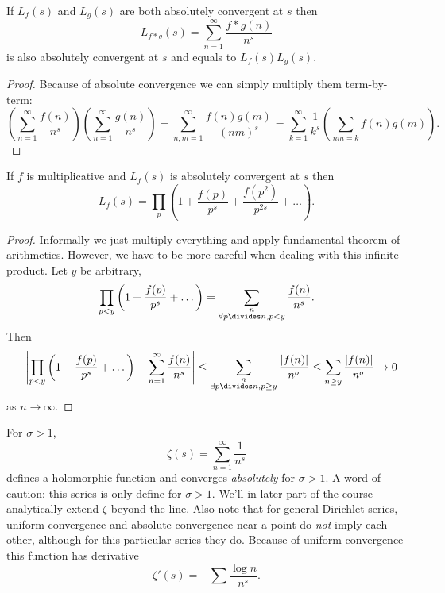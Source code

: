 \documentclass[a4paper]{article}
\theoremstyle{definition}
\begin{document}
\begin{lemma}
  If \(L_f(s)\) and \(L_g(s)\) are both absolutely convergent at \(s\) then
  \[
    L_{f * g} (s) = \sum_{n = 1}^\infty \frac{f * g (n)}{n^s}
    \]
    is also absolutely convergent at \(s\) and equals to \(L_f(s) L_g(s)\).
\end{lemma}

\begin{proof}
  Because of absolute convergence we can simply multiply them term-by-term:
  \[
    \left( \sum_{n = 1}^\infty \frac{f(n)}{n^s} \right) \left( \sum_{n = 1}^\infty \frac{g(n)}{n^s} \right)
    = \sum_{n, m = 1}^\infty \frac{f(n) g(m)}{(nm)^s} = \sum_{k = 1}^\infty \frac{1}{k^s} \left( \sum_{nm = k} f(n) g(m) \right).
  \]
\end{proof}

\begin{lemma}
  If \(f\) is multiplicative and \(L_f(s)\) is absolutely convergent at \(s\) then
  \[
    L_f(s) = \prod_p \left( 1 + \frac{f(p)}{p^s} + \frac{f(p^2)}{p^{2s}} + \dots \right).
  \]
\end{lemma}

\begin{proof}
  Informally we just multiply everything and apply fundamental theorem of arithmetics. However, we have to be more careful when dealing with this infinite product. Let \(y\) be arbitrary,
  \[
    \prod_{p < y} \left( 1 + \frac{f(p)}{p^s} + \dots \right)
    = \sum_{\substack{n \\ \forall p \divides n, p < y}} \frac{f(n)}{n^s}.
  \]
  Then
  \[
    \phantom{=} \left| \prod_{p < y} \left( 1 + \frac{f(p)}{p^s} + \dots \right) - \sum_{n = 1}^\infty \frac{f(n)}{n^s} \right|
    \leq \sum_{\substack{n \\ \exists p \divides n, p \geq y}} \frac{|f(n)|}{n^\sigma}
    \leq \sum_{n \geq y} \frac{|f(n)|}{n^\sigma}
    \to 0
  \]
  as \(n \to \infty\).
\end{proof}

For \(\sigma > 1\),
\[
  \zeta(s) = \sum_{n = 1}^\infty \frac{1}{n^s}
\]
defines a holomorphic function and converges \emph{absolutely} for \(\sigma > 1\). A word of caution: this series is only define for \(\sigma > 1\). We'll in later part of the course analytically extend \(\zeta\) beyond the line. Also note that for general Dirichlet series, uniform convergence and absolute convergence near a point do \emph{not} imply each other, although for this particular series they do. Because of uniform convergence this function has derivative
\[
  \zeta'(s) = - \sum \frac{\log n}{n^s}.
\]
\end{document}
